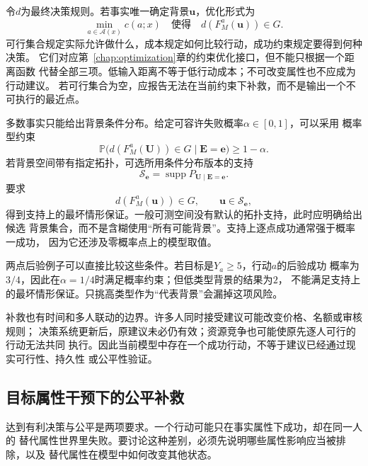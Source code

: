 令\(d\)为最终决策规则。若事实唯一确定背景\(\bm u\)，优化形式为
\begin{equation}
  \min_{a\in\mathcal A(x)}c(a;x)
  \quad\text{使得}\quad d(F_M^a(\bm u))\in G.
  \label{eq:causal-recourse-objective}
\end{equation}
可行集合规定实际允许做什么，成本规定如何比较行动，成功约束规定要得到何种决策。
它们对应第~\ref{chap:optimization}章的约束优化接口，但不能只根据一个距离函数
代替全部三项。低输入距离不等于低行动成本；不可改变属性也不应成为行动建议。
若可行集合为空，应报告无法在当前约束下补救，而不是输出一个不可执行的最近点。

多数事实只能给出背景条件分布。给定可容许失败概率\(\alpha\in[0,1]\)，可以采用
概率型约束
\begin{equation}
  \mathbb P\bigl(d(F_M^a(\bm U))\in G\mid\bm E=\bm e\bigr)
  \geq1-\alpha.
  \label{eq:causal-recourse-probability}
\end{equation}
若背景空间带有指定拓扑，可选所用条件分布版本的支持
\[
  \mathcal S_{\bm e}
  =\operatorname{supp}P_{\bm U\mid\bm E=\bm e}.
\]
要求
\begin{equation}
  d(F_M^a(\bm u))\in G,\qquad \bm u\in\mathcal S_{\bm e},
  \label{eq:causal-recourse-robust}
\end{equation}
得到支持上的最坏情形保证。一般可测空间没有默认的拓扑支持，此时应明确给出候选
背景集合，而不是含糊使用“所有可能背景”。支持上逐点成功通常强于概率一成功，
因为它还涉及零概率点上的模型取值。

两点后验例子可以直接比较这些条件。若目标是\(Y_a\geq5\)，行动\(a\)的后验成功
概率为\(3/4\)，因此在\(\alpha=1/4\)时满足概率约束；但低类型背景的结果为\(2\)，
不能满足支持上的最坏情形保证。只挑高类型作为“代表背景”会漏掉这项风险。

补救也有时间和多人联动的边界。许多人同时接受建议可能改变价格、名额或审核规则；
决策系统更新后，原建议未必仍有效；资源竞争也可能使原先逐人可行的行动无法共同
执行。因此当前模型中存在一个成功行动，不等于建议已经通过现实可行性、持久性
或公平性验证。

\subsection{目标属性干预下的公平补救}
\label{sec:causal-fair-recourse}

达到有利决策与公平是两项要求。一个行动可能只在事实属性下成功，却在同一人的
替代属性世界里失败。要讨论这种差别，必须先说明哪些属性影响应当被排除，以及
替代属性在模型中如何改变其他状态。

